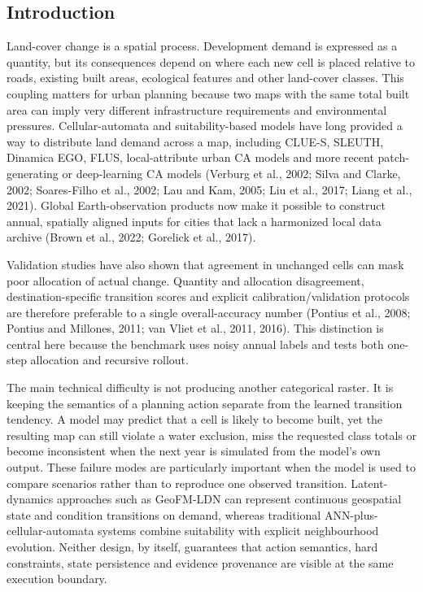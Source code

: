 \subsection{Introduction}\label{introduction}

Land-cover change is a spatial process. Development demand is expressed
as a quantity, but its consequences depend on where each new cell is
placed relative to roads, existing built areas, ecological features and
other land-cover classes. This coupling matters for urban planning
because two maps with the same total built area can imply very different
infrastructure requirements and environmental pressures.
Cellular-automata and suitability-based models have long provided a way
to distribute land demand across a map, including CLUE-S, SLEUTH,
Dinamica EGO, FLUS, local-attribute urban CA models and more recent
patch-generating or deep-learning CA models (Verburg et al., 2002; Silva
and Clarke, 2002; Soares-Filho et al., 2002; Lau and Kam, 2005; Liu et
al., 2017; Liang et al., 2021). Global Earth-observation products now
make it possible to construct annual, spatially aligned inputs for
cities that lack a harmonized local data archive (Brown et al., 2022;
Gorelick et al., 2017).

Validation studies have also shown that agreement in unchanged cells can
mask poor allocation of actual change. Quantity and allocation
disagreement, destination-specific transition scores and explicit
calibration/validation protocols are therefore preferable to a single
overall-accuracy number (Pontius et al., 2008; Pontius and Millones,
2011; van Vliet et al., 2011, 2016). This distinction is central here
because the benchmark uses noisy annual labels and tests both one-step
allocation and recursive rollout.

The main technical difficulty is not producing another categorical
raster. It is keeping the semantics of a planning action separate from
the learned transition tendency. A model may predict that a cell is
likely to become built, yet the resulting map can still violate a water
exclusion, miss the requested class totals or become inconsistent when
the next year is simulated from the model's own output. These failure
modes are particularly important when the model is used to compare
scenarios rather than to reproduce one observed transition.
Latent-dynamics approaches such as GeoFM-LDN can represent continuous
geospatial state and condition transitions on demand, whereas
traditional ANN-plus-cellular-automata systems combine suitability with
explicit neighbourhood evolution. Neither design, by itself, guarantees
that action semantics, hard constraints, state persistence and evidence
provenance are visible at the same execution boundary.

